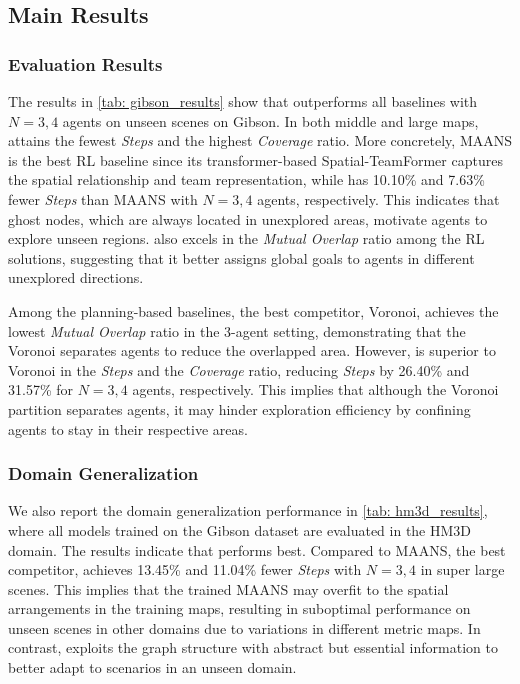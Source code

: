 \subsection{Main Results}
\subsubsection{Evaluation Results}
The results in \cref{tab: gibson_results} show that {\name} outperforms all baselines with $N=3,4$ agents on unseen scenes on Gibson.
In both middle and large maps, {\name} attains the fewest \emph{Steps} and the highest \emph{Coverage} ratio. More concretely, MAANS is the best RL baseline since its transformer-based Spatial-TeamFormer captures the spatial relationship and team representation, while {\name} has 10.10\% and 7.63\% fewer \emph{Steps} than MAANS with $N=3,4$ agents, respectively. This indicates that ghost nodes, which are always located in unexplored areas, motivate agents to explore unseen regions. {\name} also excels in the \emph{Mutual Overlap} ratio among the RL solutions, suggesting that it better assigns global goals to agents in different unexplored directions.


Among the planning-based baselines, the best competitor, Voronoi, achieves the lowest \emph{Mutual Overlap} ratio in the 3-agent setting, demonstrating that the Voronoi separates agents to reduce the overlapped area. However, {\name} is superior to Voronoi in the \emph{Steps} and the \emph{Coverage} ratio, reducing \emph{Steps} by 26.40\% and 31.57\% for $N=3,4$ agents, respectively.
This implies that although the Voronoi partition separates agents, it may hinder exploration efficiency by confining agents to stay in their respective areas. 



\subsubsection{Domain Generalization}
We also report the domain generalization performance in \cref{tab: hm3d_results}, where
all models trained on the Gibson dataset are evaluated in the HM3D domain.
The results indicate that {\name} performs best. Compared to {MAANS}, the best competitor, {\name} achieves 13.45\% and 11.04\% fewer \emph{Steps} with $N=3,4$ in super large scenes. This implies that the trained MAANS may overfit to the spatial arrangements in the training maps, resulting in suboptimal performance on unseen scenes in other domains due to variations in different metric maps.
In contrast, {\name} exploits the graph structure with abstract but essential information to better adapt to scenarios in an unseen domain. 


